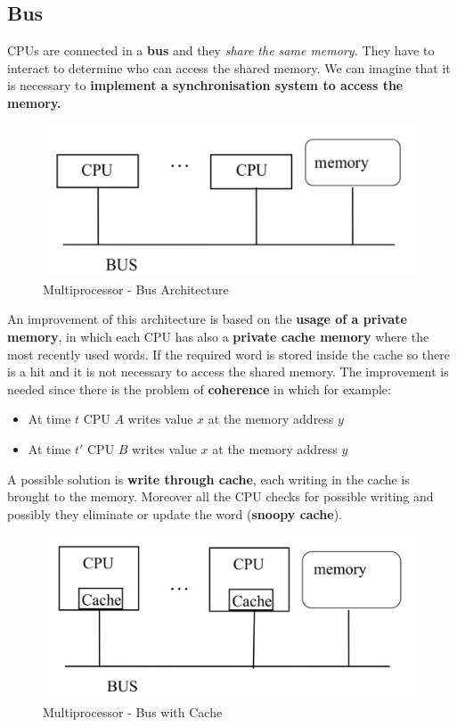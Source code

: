 \subsection{Bus}
CPUs are connected in a \textbf{bus} and they \textit{share the same memory.} They have to interact to determine who can access the shared memory. We can imagine that it is necessary to \textbf{implement a synchronisation system  to access the memory.}
\begin{figure}[!h]
            \centering
            \includegraphics[width=.45\linewidth]{images/distributedSystem/busArchitecture.jpeg}
            \caption{Multiprocessor - Bus Architecture}
    \end{figure}
An improvement of this architecture is based on the \textbf{usage of a private memory}, in which each CPU has also a \textbf{private cache memory} where the most recently used words. If the required word is stored inside the cache so there is a hit and it is not necessary to access the shared memory.
The improvement is needed since there is the problem of \textbf{coherence} in which for example:
\begin{itemize}
    \item At time \(t\) CPU \(A\) writes value \(x\) at the memory address \(y\)
    \item At time \(t'\) CPU \(B\) writes value \(x\) at the memory address \(y\)
\end{itemize}
A possible solution is \textbf{write through cache}, each writing in the cache is brought to the memory. Moreover all the CPU checks for possible writing and possibly they eliminate or update the word (\textbf{snoopy cache}).
\begin{figure}
            \centering
            \includegraphics[width=.45\linewidth]{images/distributedSystem/busCache.jpeg}
            \caption{Multiprocessor - Bus with Cache}
    \end{figure}
\newpage
